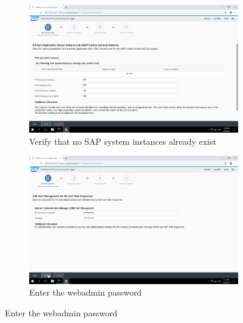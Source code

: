 \begin{figure}[!htb]\ContinuedFloat
    \begin{subfigure}{0.5\textwidth}
        \captionsetup{width=0.8\linewidth}
        \includegraphics[width=0.9\linewidth]{img/Methodologie/SAP14.png}
        \centering
        \caption{Verify that no SAP system instances already exist}
    \end{subfigure}
    \begin{subfigure}{0.5\textwidth}
    \captionsetup{width=0.8\linewidth}
    \includegraphics[width=0.9\linewidth]{img/Methodologie/SAP12.png}
    \centering
    \caption{Enter the webadmin password}
    \end{subfigure}
\end{figure}
